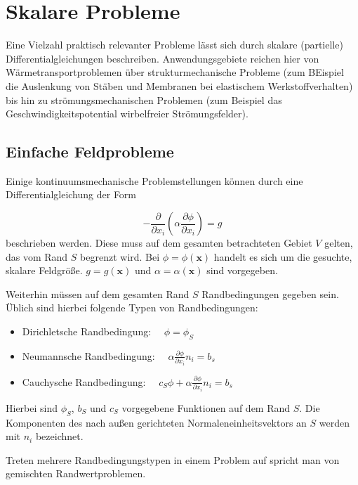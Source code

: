 \section{Skalare Probleme}

Eine Vielzahl praktisch relevanter Probleme lässt sich durch skalare (partielle)
Differential\-glei\-chungen beschreiben. Anwendungsgebiete reichen hier von Wärmetransportproblemen
über strukturmechanische Probleme (zum BEispiel die Auslenkung von Stäben und Membranen bei elastischem
Werkstoffverhalten) bis hin zu strömungsmechanischen Problemen (zum Beispiel das Geschwindigkeitspotential
wirbelfreier Strömungsfelder).

\subsection{Einfache Feldprobleme}

Einige kontinuumsmechanische Problemstellungen können durch eine Differentialgleichung
der Form

\begin{equation}
  -\frac{\partial}{\partial x_i}\left({\alpha \frac{\partial \phi}{\partial x_i} }\right)=g
  \label{eq:feldproblem_stat}
\end{equation}
 beschrieben werden. Diese muss auf dem gesamten betrachteten Gebiet $V$ gelten, das
vom Rand $S$ begrenzt wird. Bei $\phi=\phi(\mathbf{x})$ handelt es sich um die gesuchte,
skalare Feldgröße. $g=g(\mathbf{x})$ und $\alpha=\alpha(\mathbf{x})$ sind vorgegeben.


Weiterhin müssen auf dem gesamten Rand $S$ Randbedingungen
gegeben sein. Üblich sind hierbei folgende Typen von Randbedingungen:

\begin{itemize}
  \item Dirichletsche Randbedingung: $\quad \phi=\phi_S$
  \item Neumannsche Randbedingung: $\quad \alpha \frac{\partial \phi}{\partial x_i} n_i = b_s $
  \item Cauchysche Randbedingung: $\quad c_S \phi + \alpha \frac{\partial \phi}{\partial x_i} n_i = b_s$
\end{itemize}

Hierbei sind $\phi_S$, $b_S$ und $c_S$ vorgegebene Funktionen auf dem Rand $S$. Die
Komponenten des nach außen gerichteten Normaleneinheitsvektors an $S$ werden mit $n_i$ bezeichnet.

Treten mehrere Randbedingungstypen in einem Problem auf spricht man von gemischten Rand\-wert\-problemen.

